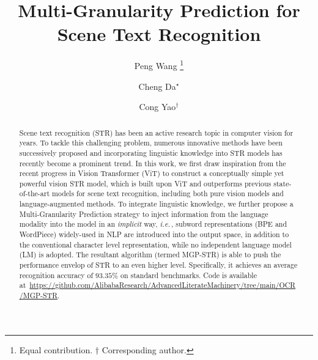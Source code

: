 \documentclass[runningheads]{llncs}
\def\ie{\emph{i.e.}\,}
\begin{document}
\pagestyle{headings}
\mainmatter
\def\ECCVSubNumber{3821}  

\title{Multi-Granularity Prediction for Scene Text Recognition} 

\begin{comment}
\titlerunning{ECCV-22 submission ID \ECCVSubNumber} 
\authorrunning{ECCV-22 submission ID \ECCVSubNumber} 
\author{Anonymous ECCV submission}
\institute{Paper ID \ECCVSubNumber}
\end{comment}


\author{Peng Wang \thanks{Equal contribution. $\dagger$ Corresponding author.} \and
Cheng Da$^{\star}$ \and
Cong Yao$^{\dagger}$  }

\maketitle

\begin{abstract}
Scene text recognition (STR) has been an active research topic in computer vision for years. To tackle this challenging problem, numerous innovative methods have been successively proposed and incorporating linguistic knowledge into STR models has recently become a prominent trend. In this work, we first draw inspiration from the recent progress in Vision Transformer (ViT) to construct a conceptually simple yet powerful vision STR model, which is built upon ViT and outperforms previous state-of-the-art models for scene text recognition, including both pure vision models and language-augmented methods. To integrate linguistic knowledge, we further propose a Multi-Granularity Prediction strategy to inject information from the language modality into the model in an \textit{implicit} way, \ie, subword representations (BPE and WordPiece) widely-used in NLP are introduced into the output space, in addition to the conventional character level representation, while no independent language model (LM) is adopted. The resultant algorithm (termed MGP-STR) is able to push the performance envelop of STR to an even higher level. Specifically, it achieves an average recognition accuracy of $93.35\%$ on standard benchmarks. Code is available at~\url{https://github.com/AlibabaResearch/AdvancedLiterateMachinery/tree/main/OCR/MGP-STR}.
\end{abstract}
\end{document}
